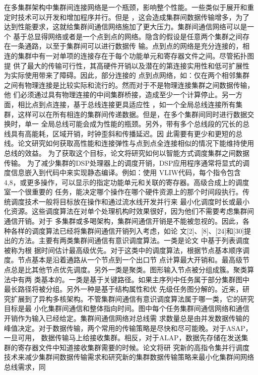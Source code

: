 在多集群架构中集群间连接网络是一个瓶颈，影响整个性能。一些类似于展开和重定时技术可以开发和增加程序并行。但是
，这会造成集群间数据传输增多，为了达到性能要求，这就给集群间通信网络施加了更大压力。集群间通信网络可以是一个
基于总显得网络或者是一个点到点的网络。隐含的假设是任意两个集群之间存在一条通路，以至于集群间可以进行数据传
输。点到点的网络是充分连接的，相连的集群中有一对单项的连接存在于每个功能单元和寄存器文件之间。尽管拓扑图提
供了最大的传输可行性，其高硬件开销以及潜在的第连接实用性和低可扩展性为实际使用带来了障碍。因此，部分连接的
点到点网络，如：仅在两个相邻集群之间有物理连接是比较实际和流行的。然而对于不是物理连接集群之间数据传输，他
们必须通过具有物理连接的中间集群桥接，造成至少一个计算停止。另一方面，相比点到点连接，基于总线连接更具适应性
，如一个全局总线连接所有集群，这样可以在所有相连的集群间传递数据。但是，在多个集群间同时进行数据交换时，单一
全局总线可能会成为性能的瓶颈。另外，带有多个总线段的冗长的总线具有高能耗，区域开销，时钟歪斜和传播延迟。因
此需要有更少和更短的总线。论文研究如何获取高性能和连接弹性与点到点全连接相似的情况下能维持使用总线的效益。
为了获取这个目标，论文将研究如何以智能方式调度集群之间数据传输。
为了减少集群的DSP处理器上的调度开销，DSP应用程序通常将显式的调度信息嵌入到代码中来实现静态编译。例如：使用
VLIW代码，每个指令包含4,8，或更多操作，可以显示的指定功能单元和关联的寄存器。高级合成上的调度室一个很重要的
任务，能决定哪个操作在哪个硬件资源上的那个时间段执行。传统调度技术一般将目标放在操作和通过流水线开发并行来
最小化调度时长或最小化资源。这些调度算法在对单个处理机构时效果很好，因为他们不需要考虑集群间通信开销。对于
多集群或多喝架构，集群间通信开销是不能被忽视的。因此，各种各样的调度算法已经将集群间通信开销列入考虑，如论
文\cite{cnproceed}[2]、[8]、[24]和[30]提出的方法。主要有两类集群间通信有意识调度算法。一类是论文 中基于列表调度被称为根
据时间估计最高级优先。对于这类中的调度算法，根据节点基本顺序调度。节点基本是沿着通路从一个节点到一个出口节
点计算最大开销和。最高级节点总是比其他节点优先调度。另外一类是聚类。图形输入节点被分组成簇。聚类算法中有两
类基本的。一类是基于关键路径。如果主序列中任务属于部分集群图中最长路径将被分组。另外一种是基于结构属性和优
先级任务图分解的。近来，研究扩展到了异构多核架构。不管集群间通信有意识调度算法属于哪一类，它的研究目标是最
小化集群间通信和整体指向时间。图中每个任务集群间通信网络和通信开销作为输入已经给定。集群间通信网络对总线需
求数量总是由并发数据传输的峰值决定。对于数据传输，两个常用的传输策略是尽快和尽可能晚。对于ASAP，一旦可用，
数据传输马上给接收集群。相反，对于ALAP，数据先存储在发送集群的寄存器文件中知道接收集群需要的时候。论文将研
究新的高指令集并行调度技术来减少集群间数据传输需求和研究新的集群数据传输策略来最小化集群间网络总线需求，同
